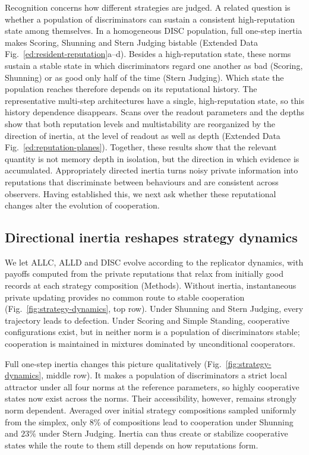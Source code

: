 \documentclass[fleqn,10pt]{article}
\begin{document}
Recognition concerns how different strategies are judged. A related question is whether a population of discriminators can sustain a consistent high-reputation state among themselves. In a homogeneous DISC population, full one-step inertia makes Scoring, Shunning and Stern Judging bistable (Extended Data Fig.~\ref{ed:resident-reputation}a--d). Besides a high-reputation state, these norms sustain a stable state in which discriminators regard one another as bad (Scoring, Shunning) or as good only half of the time (Stern Judging). Which state the population reaches therefore depends on its reputational history. The representative multi-step architectures have a single, high-reputation state, so this history dependence disappears. Scans over the readout parameters and the depths show that both reputation levels and multistability are reorganized by the direction of inertia, at the level of readout as well as depth (Extended Data Fig.~\ref{ed:reputation-planes}). Together, these results show that the relevant quantity is not memory depth in isolation, but the direction in which evidence is accumulated. Appropriately directed inertia turns noisy private information into reputations that discriminate between behaviours and are consistent across observers. Having established this, we next ask whether these reputational changes alter the evolution of cooperation.

\subsection*{Directional inertia reshapes strategy dynamics}

We let ALLC, ALLD and DISC evolve according to the replicator dynamics, with payoffs computed from the private reputations that relax from initially good records at each strategy composition (Methods). Without inertia, instantaneous private updating provides no common route to stable cooperation (Fig.~\ref{fig:strategy-dynamics}, top row). Under Shunning and Stern Judging, every trajectory leads to defection. Under Scoring and Simple Standing, cooperative configurations exist, but in neither norm is a population of discriminators stable; cooperation is maintained in mixtures dominated by unconditional cooperators.

Full one-step inertia changes this picture qualitatively (Fig.~\ref{fig:strategy-dynamics}, middle row). It makes a population of discriminators a strict local attractor under all four norms at the reference parameters, so highly cooperative states now exist across the norms. Their accessibility, however, remains strongly norm dependent. Averaged over initial strategy compositions sampled uniformly from the simplex, only $8\%$ of compositions lead to cooperation under Shunning and $23\%$ under Stern Judging. Inertia can thus create or stabilize cooperative states while the route to them still depends on how reputations form.
\end{document}
